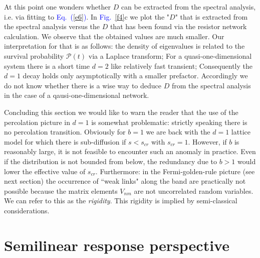 \documentclass[aps,pre,floats,floatfix,twocolumn]{revtex4}
\newcommand{\Eq}[1]{\textcolor{blue}{Eq.\!\!~(\ref{#1})}}
\newcommand{\Fig}[1]{\textcolor{blue}{Fig.}\!\!~\ref{#1}}
\begin{document}
At this point one wonders whether $D$ can be extracted 
from the spectral analysis, i.e. via fitting to \Eq{e6}.
In \Fig{f4}c we plot the "$D$" that is extracted 
from the spectral analysis versus the $D$ that  
has been found via the resistor network calculation.
We observe that the obtained values are much smaller.
Our interpretation for that is as follows: 
the density of eigenvalues is related to the survival 
probability $\mathcal{P}(t)$ via a Laplace transform;  
For a quasi-one-dimensional system there is a short time $d{=}2$ like 
relatively fast transient; Consequently the $d{=}1$ decay 
holds only asymptotically with a smaller prefactor.  
Accordingly we do not know whether there is a wise 
way to deduce $D$ from the spectral analysis in the 
case of a qausi-one-dimensional network.

Concluding this section we would like to warn the reader
that the use of the percolation picture in $d{=}1$ is 
somewhat problematic: strictly speaking  
there is no percolation transition. Obviously 
for ${b=1}$ we are back with the $d{=}1$ lattice model 
for which there is sub-diffusion if ${s<s_{cr}}$ 
with ${s_{cr}=1}$. However, if $b$ is reasonably large, 
it is not feasible to encounter such an anomaly 
in practice. Even if the distribution is not bounded 
from below, the redundancy due to ${b>1}$ 
would lower the effective value of $s_{cr}$. 
Furthermore: in the Fermi-golden-rule picture (see next section) 
the occurrence of ``weak links" along the band  
are practically not possible because the matrix elements $V_{nm}$ 
are not uncorrelated random variables. 
We can refer to this as the {\em rigidity}.
This rigidity is implied by semi-classical considerations. 


\section{Semilinear response perspective}
\end{document}
